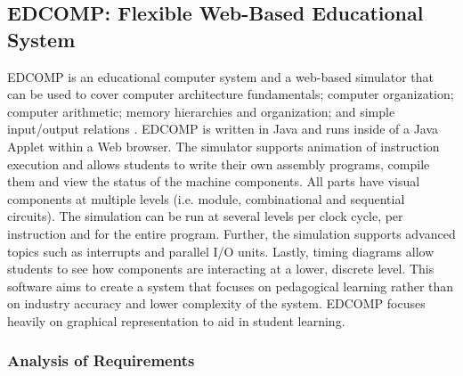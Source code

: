 \subsection{EDCOMP: Flexible Web-Based Educational System}
\label{sec:review-edcomp}

EDCOMP is an educational computer system and a web-based simulator that can be used to cover computer architecture fundamentals; computer organization; computer arithmetic; memory hierarchies and organization; and simple input/output relations \cite{Djordjevic2005}. EDCOMP is written in Java and runs inside of a Java Applet within a Web browser. The simulator supports animation of instruction execution and allows students to write their own assembly programs, compile them and view the status of the machine components. All parts have visual components at multiple levels (i.e. module, combinational and sequential circuits). The simulation can be run at several levels per clock cycle, per instruction and for the entire program. Further, the simulation supports advanced topics such as interrupts and parallel I/O units. Lastly, timing diagrams allow students to see how components are interacting at a lower, discrete level. This software aims to create a system that focuses on pedagogical learning rather than on industry accuracy and lower complexity of the system. EDCOMP focuses heavily on graphical representation to aid in student learning.

\subsubsection*{Analysis of Requirements}

